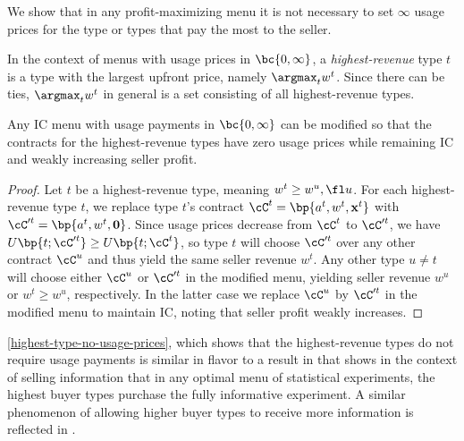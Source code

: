 


We show that in any profit-maximizing menu it is not necessary to set $\infty$ usage prices for the type or types that pay the most to the seller.

\begin{definition*} \label{highest-revenue-definition}
    In the context of menus with usage prices in $\bc{0,\infty}$, a \emph{highest-revenue} type $t$ is a type with the largest upfront price, namely $\argmax_{t} w^t$. Since there can be ties, $\argmax_{t} w^t$ in general is a set consisting of all highest-revenue types.
\end{definition*}

\begin{proposition} \label{highest-type-no-usage-prices}
    Any IC menu with usage payments in $\bc{0,\infty}$ can be modified so that the contracts for the highest-revenue types have zero usage prices while remaining IC and weakly increasing seller profit.
\end{proposition}

\begin{proof}
    Let $t$ be a highest-revenue type, meaning $w^t\ge w^u,\fl u$. For each highest-revenue type $t$, we replace type $t$'s contract $\cC^t = \bp{a^t, w^t, \mathbf{x}^t}$ with $\cC'^t = \bp{a^t, w^t, \mathbf{0}}$. Since usage prices decrease from $\cC^t$ to $\cC'^t$, we have $U\bp{t; \cC'^t} \ge U\bp{t; \cC^t}$, so type $t$ will choose $\cC'^t$ over any other contract $\cC^u$ and thus yield the same seller revenue $w^t$. Any other type $u\neq t$ will choose either $\cC^u$ or $\cC'^t$ in the modified menu, yielding seller revenue $w^u$ or $w^t \ge w^u$, respectively. In the latter case we replace $\cC^u$ by $\cC'^t$ in the modified menu to maintain IC, noting that seller profit weakly increases.
\end{proof}

\begin{remark*}
     \cref{highest-type-no-usage-prices}, which shows that the highest-revenue types do not require usage payments is similar in flavor to a result in \citet{bergemann2018design} that shows in the context of selling information that in any optimal menu of statistical experiments, the highest buyer types purchase the fully informative experiment. A similar phenomenon of allowing higher buyer types to receive more information is reflected in \citet{liu2021optimal}.
\end{remark*}